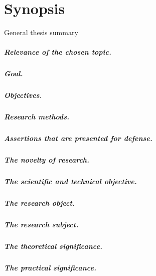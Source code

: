 \chapter*{Synopsis}

\begin{center}
    General thesis summary
\end{center}


\paragraph*{Relevance of the chosen topic.}
\paragraph*{Goal.}
\paragraph*{Objectives.}
\paragraph*{Research methods.}
\paragraph*{Assertions that are presented for defense.}
\paragraph*{The novelty of research.}
\paragraph*{The scientific and technical objective.}
\paragraph*{The research object.}
\paragraph*{The research subject.}
\paragraph*{The theoretical significance.}
\paragraph*{The practical significance.}
